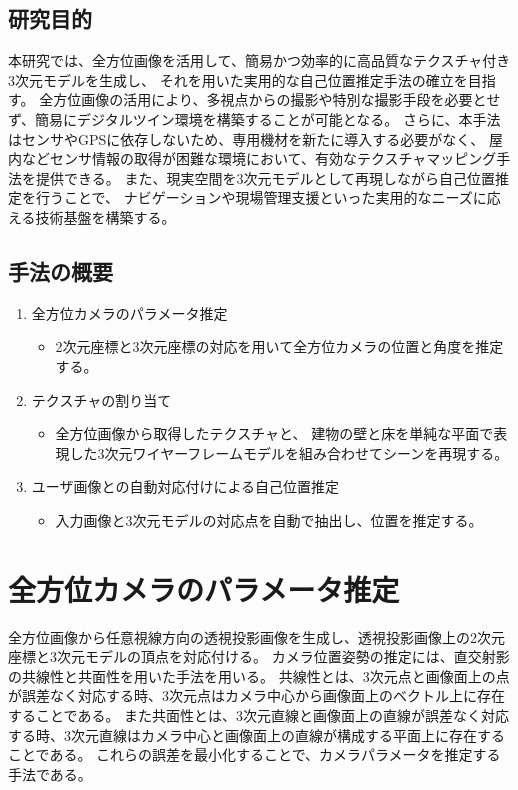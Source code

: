 \documentclass[]{jarticle}          %
\begin{document}
\subsection{研究目的}
本研究では、全方位画像を活用して、簡易かつ効率的に高品質なテクスチャ付き3次元モデルを生成し、
それを用いた実用的な自己位置推定手法の確立を目指す。
全方位画像の活用により、多視点からの撮影や特別な撮影手段を必要とせず、簡易にデジタルツイン環境を構築することが可能となる。
さらに、本手法はセンサやGPSに依存しないため、専用機材を新たに導入する必要がなく、
屋内などセンサ情報の取得が困難な環境において、有効なテクスチャマッピング手法を提供できる。
また、現実空間を3次元モデルとして再現しながら自己位置推定を行うことで、
ナビゲーションや現場管理支援といった実用的なニーズに応える技術基盤を構築する。
\subsection{手法の概要}
\begin{enumerate}
  \item 全方位カメラのパラメータ推定
  \begin{itemize}
    \item 2次元座標と3次元座標の対応を用いて全方位カメラの位置と角度を推定する。
  \end{itemize}
  
  \item テクスチャの割り当て
  \begin{itemize}
    \item 全方位画像から取得したテクスチャと、
    建物の壁と床を単純な平面で表現した3次元ワイヤーフレームモデルを組み合わせてシーンを再現する。
  \end{itemize}
  
  \item ユーザ画像との自動対応付けによる自己位置推定
  \begin{itemize}
    \item 入力画像と3次元モデルの対応点を自動で抽出し、位置を推定する。
  \end{itemize}
\end{enumerate}
  
\section{全方位カメラのパラメータ推定}
全方位画像から任意視線方向の透視投影画像を生成し、透視投影画像上の2次元座標と3次元モデルの頂点を対応付ける。
カメラ位置姿勢の推定には、直交射影の共線性と共面性を用いた手法\cite{bib3}を用いる。
共線性とは、3次元点と画像面上の点が誤差なく対応する時、3次元点はカメラ中心から画像面上のベクトル上に存在することである。
また共面性とは、3次元直線と画像面上の直線が誤差なく対応する時、3次元直線はカメラ中心と画像面上の直線が構成する平面上に存在することである。
これらの誤差を最小化することで、カメラパラメータを推定する手法である。
\end{document}
